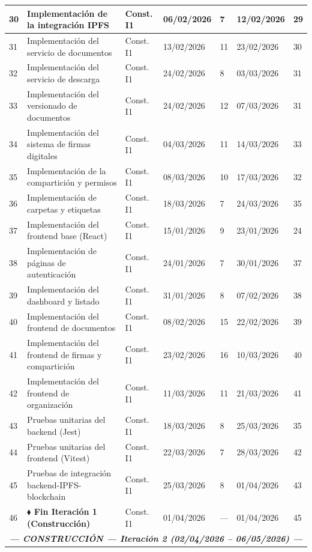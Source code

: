 \documentclass[11pt, a4paper]{article}
\begin{document}
\begin{longtable}{|p{0.6cm}|p{5.2cm}|p{2.5cm}|p{1.9cm}|p{0.9cm}|p{1.9cm}|p{1.4cm}|}
\hline
30 & Implementación de la integración IPFS & Const. I1 & 06/02/2026 & 7 & 12/02/2026 & 29 \\
\hline
31 & Implementación del servicio de documentos & Const. I1 & 13/02/2026 & 11 & 23/02/2026 & 30 \\
\hline
32 & Implementación del servicio de descarga & Const. I1 & 24/02/2026 & 8 & 03/03/2026 & 31 \\
\hline
33 & Implementación del versionado de documentos & Const. I1 & 24/02/2026 & 12 & 07/03/2026 & 31 \\
\hline
34 & Implementación del sistema de firmas digitales & Const. I1 & 04/03/2026 & 11 & 14/03/2026 & 33 \\
\hline
35 & Implementación de la compartición y permisos & Const. I1 & 08/03/2026 & 10 & 17/03/2026 & 32 \\
\hline
36 & Implementación de carpetas y etiquetas & Const. I1 & 18/03/2026 & 7 & 24/03/2026 & 35 \\
\hline
37 & Implementación del frontend base (React) & Const. I1 & 15/01/2026 & 9 & 23/01/2026 & 24 \\
\hline
38 & Implementación de páginas de autenticación & Const. I1 & 24/01/2026 & 7 & 30/01/2026 & 37 \\
\hline
39 & Implementación del dashboard y listado & Const. I1 & 31/01/2026 & 8 & 07/02/2026 & 38 \\
\hline
40 & Implementación del frontend de documentos & Const. I1 & 08/02/2026 & 15 & 22/02/2026 & 39 \\
\hline
41 & Implementación del frontend de firmas y compartición & Const. I1 & 23/02/2026 & 16 & 10/03/2026 & 40 \\
\hline
42 & Implementación del frontend de organización & Const. I1 & 11/03/2026 & 11 & 21/03/2026 & 41 \\
\hline
43 & Pruebas unitarias del backend (Jest) & Const. I1 & 18/03/2026 & 8 & 25/03/2026 & 35 \\
\hline
44 & Pruebas unitarias del frontend (Vitest) & Const. I1 & 22/03/2026 & 7 & 28/03/2026 & 42 \\
\hline
45 & Pruebas de integración backend-IPFS-blockchain & Const. I1 & 25/03/2026 & 8 & 01/04/2026 & 43 \\
\hline
46 & \textbf{$\blacklozenge$ Fin Iteración 1 (Construcción)} & Const. I1 & 01/04/2026 & --- & 01/04/2026 & 45 \\
\hline
\multicolumn{7}{|c|}{\textit{\textbf{--- CONSTRUCCIÓN --- Iteración 2 (02/04/2026 -- 06/05/2026) ---}}} \\

\end{longtable}
\end{document}
